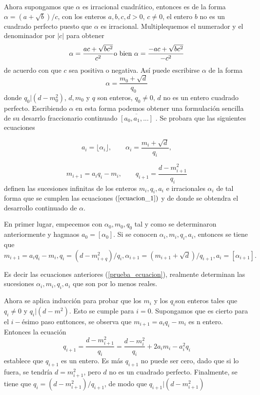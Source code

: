\documentclass[11pt, article]{article}
\begin{document}
    Ahora supongamos que $\alpha$ es irracional cuadrático, entonces es de la forma $\alpha=(a+\sqrt{b})/c$, con los enteros $a,b,c,d>0$, $c\not=0$, el entero $b$ no es un cuadrado perfecto puesto que $\alpha$ es irracional. Multiplequemos el numerador y el denominador por $|c|$ para obtener 
        \[
        \alpha = \dfrac{ac + \sqrt{bc^2}}{c^2} \textnormal{o bien } \alpha=\dfrac{-ac+\sqrt{bc^2}}{-c^2}
        \]
    de acuerdo con que $c$ sea positiva o negativa. Así puede escribirse $\alpha$ de la forma
        \[
        \alpha = \dfrac{m_0+\sqrt{d}}{q_0}
        \]
    donde $q_0|(d-m_0^2)$, $d,m_0$ y $q$ son enteros, $q_0\not=0$, $d$ no es un entero cuadrado perfecto. Escribiendo $\alpha$ en esta forma podemos obtener una formulación sencilla de su desarrlo fraccionario continuado $\overline{[a_0,a_1,...]}$ . Se probara que las siguientes ecuaciones 

        \begin{equation}
        a_i= \lfloor \alpha_i \rfloor, \qquad \alpha_i=\dfrac{m_i+\sqrt{d}}{q_i}, \label{prueba_ecuacion}
        \end{equation}
        
        \[
        m_{i+1}=a_iq_i-m_i, \qquad q_{i+1}=\dfrac{d-m_{i+1}^2}{q_i}
        \] 
    definen las sucesiones infinitas de los enteros $m_i,q_i,a_i$ e irracionales $\alpha_i$ de tal forma que se cumplen las ecuaciones $(\ref{ecuacion_1})$ y de donde se obtendra el desarrollo continuado de $\alpha$.

    En primer lugar, empecemos con $\alpha_0,m_0,q_0$ tal y como se determinaron anteriormente  y hagmaos $a_0=[\alpha_0]$. Si se conocen $\alpha_i,m_i,q_i,a_i$, entonces se tiene que 
        \[
         m_{i+1}=a_iq_i - m_i, q_i=(d-m_{i+q}^2)/q_i, \alpha_{i+1}=(m_{i+1} + \sqrt{d})/q_{i+1}, a_i=[\alpha_{i+1}].
         \]
    
    Es decir las ecuaciones anteriores (\ref{prueba_ecuacion}), realmente determinan las sucesiones $\alpha_i,m_i,q_i,a_i$ que son por lo menos reales.
    
    Ahora se aplica inducción para probar que los $m_i$ y los $q_i$son enteros tales que $q_i\not=0$ y $q_i|(d-m^2)$. Esto se cumple para $i=0$. Supongamos que es cierto para el $i-$ésimo paso enttonces, se observa que $m_{i+1}=a_iq_i-m_i$ es n entero. Entonces la ecuación 
         \[
        q_{i+1}=\dfrac{d-m_{i+1}^2}{q_i}=\dfrac{d-m_i^2}{q_i} + 2a_im_i-a_i^2q_i
        \]
    establece que $q_{i+1}$ es un entero. Es más $q_{i+1}$ no puede ser cero, dado que si lo fuera, se tendría $d=m^2_{i+1}$, pero $d$ no es un cuadrado perfecto. Finalmente, se tiene que $q_i=(d-m_{i+1}^2)/q_{i+1}$, de modo que $q_{i+1}|(d-m_{i+1}^2)$
    
\end{document}
